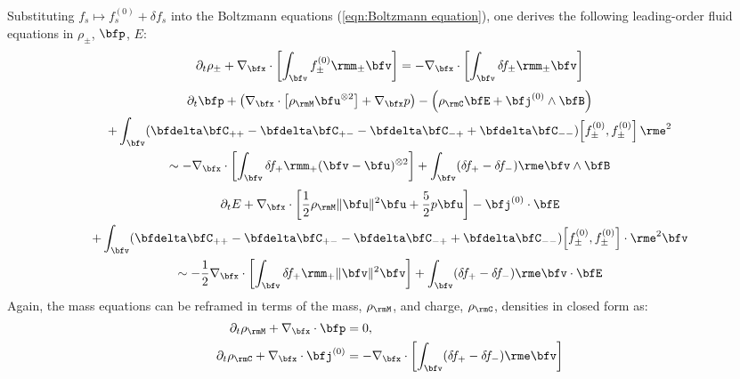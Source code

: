     Substituting $f_{s}  \mapsto  f_{s}^{(0)} + \delta\!f_{s}$ into the Boltzmann equations (\ref{eqn:Boltzmann equation}), one derives the following leading-order fluid equations in $\rho_{\pm}$, $\bfp$, $E$:
    \begin{equation}\label{eqn:PiC-coupled mass conservation}
        \partial_{t}\rho_{\pm} + \nabla_{\bfx}\cdot\left[\int_{\bfv}f_{\pm}^{(0)}\rmm_{\pm}\bfv\right]  =  - \nabla_{\bfx}\cdot\left[\int_{\bfv}\delta\!f_{\pm}\rmm_{\pm}\bfv\right]
    \end{equation}
    \vspace{-20pt}
    \begin{multline}
        \partial_{t}\bfp + \left(\nabla_{\bfx}\cdot\left[\rho_{\rmM}\bfu^{\otimes 2}\right] + \nabla_{\bfx}p\right) - \left(\rho_{\rmC}\bfE + \bfj^{(0)}\wedge\bfB\right) \\
        + \int_{\bfv}(\bfdelta\bfC_{++} - \bfdelta\bfC_{+-} - \bfdelta\bfC_{-+} + \bfdelta\bfC_{--})\!\left[f_{\pm}^{(0)}, f_{\pm}^{(0)}\right]\rme^{2}  \\
        \sim  - \nabla_{\bfx}\cdot\left[\int_{\bfv}\delta\!f_{+}\rmm_{+}(\bfv - \bfu)^{\otimes 2}\right] + \int_{\bfv}(\delta\!f_{+} - \delta\!f_{-})\rme\bfv\wedge\bfB
    \end{multline}
    \vspace{-25pt}
    \begin{multline}
        \partial_{t}E + \nabla_{\bfx}\cdot\left[\frac{1}{2}\rho_{\rmM}\|\bfu\|^{2}\bfu + \frac{5}{2}p\bfu\right] - \bfj^{(0)}\cdot\bfE  \\
        + \int_{\bfv}(\bfdelta\bfC_{++} - \bfdelta\bfC_{+-} - \bfdelta\bfC_{-+} + \bfdelta\bfC_{--})\!\left[f_{\pm}^{(0)}, f_{\pm}^{(0)}\right]\cdot\rme^{2}\bfv  \\
        \sim  - \frac{1}{2}\nabla_{\bfx}\cdot\left[\int_{\bfv}\delta\!f_{+}\rmm_{+}\|\bfv\|^{2}\bfv\right] + \int_{\bfv}(\delta\!f_{+} - \delta\!f_{-})\rme\bfv\cdot\bfE
    \end{multline}
    Again, the mass equations can be reframed in terms of the mass, $\rho_{\rmM}$, and charge, $\rho_{\rmC}$, densities in closed form as:
    \begin{align}
              \partial_{t}\rho_{\rmM} + \nabla_{\bfx}\cdot\bfp  &=  0,  \\
        \partial_{t}\rho_{\rmC} + \nabla_{\bfx}\cdot\bfj^{(0)}  &=  - \nabla_{\bfx}\cdot\left[\int_{\bfv}(\delta\!f_{+} - \delta\!f_{-})\rme\bfv\right]  \label{eqn:PiC-coupled charge conservation}
    \end{align}
